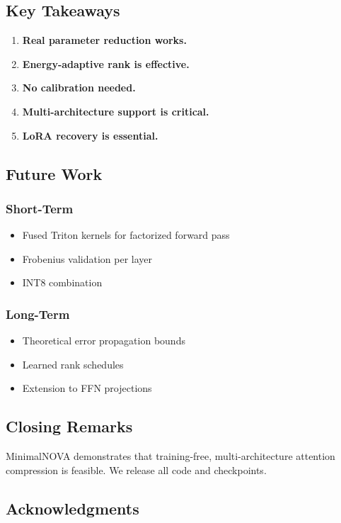 \subsection{Key Takeaways}

\begin{enumerate}
\item \textbf{Real parameter reduction works.}
\item \textbf{Energy-adaptive rank is effective.}
\item \textbf{No calibration needed.}
\item \textbf{Multi-architecture support is critical.}
\item \textbf{LoRA recovery is essential.}

\end{enumerate}
\subsection{Future Work}

\subsubsection{Short-Term}
\begin{itemize}
\item Fused Triton kernels for factorized forward pass
\item Frobenius validation per layer
\item INT8 combination

\end{itemize}
\subsubsection{Long-Term}
\begin{itemize}
\item Theoretical error propagation bounds
\item Learned rank schedules
\item Extension to FFN projections

\end{itemize}
\subsection{Closing Remarks}

MinimalNOVA demonstrates that training-free, multi-architecture attention 
compression is feasible. We release all code and checkpoints.

\subsection{Acknowledgments}

